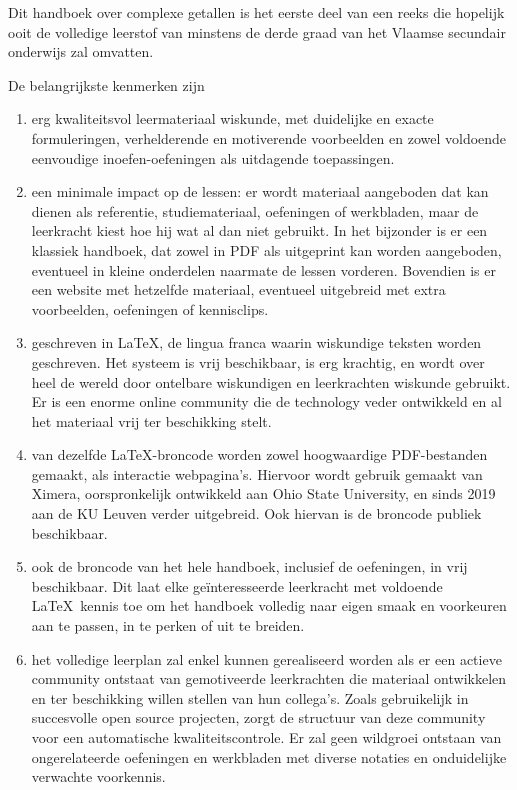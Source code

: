 \documentclass{ximera}
\begin{document}
	\author{Wim Obbels}
	\label{xim:xuitleg_leerkrachten}

    Dit handboek over complexe getallen is het eerste deel van een reeks die hopelijk ooit de volledige leerstof van minstens de derde graad van het Vlaamse secundair onderwijs zal omvatten.

    De belangrijkste kenmerken zijn
    \begin{enumerate}
        \item erg kwaliteitsvol leermateriaal wiskunde, met duidelijke en exacte formuleringen, verhelderende en motiverende voorbeelden en zowel voldoende eenvoudige inoefen-oefeningen als uitdagende toepassingen.
        \item een minimale impact op de lessen: er wordt materiaal aangeboden dat kan dienen als referentie, studiemateriaal, oefeningen of werkbladen, maar de leerkracht kiest hoe hij wat al dan niet gebruikt. In het bijzonder is er een klassiek handboek, dat zowel in PDF als uitgeprint kan worden aangeboden, eventueel in kleine onderdelen naarmate de lessen vorderen. Bovendien is er een website met hetzelfde materiaal, eventueel uitgebreid met extra voorbeelden, oefeningen of kennisclips.
        \item geschreven in \LaTeX, de lingua franca waarin wiskundige teksten worden geschreven. Het systeem is vrij beschikbaar, is erg krachtig, en wordt over heel de wereld door ontelbare wiskundigen en leerkrachten wiskunde gebruikt. Er is een enorme online community die de technology veder ontwikkeld en al het materiaal vrij ter beschikking stelt.
        \item van dezelfde \LaTeX-broncode worden zowel hoogwaardige PDF-bestanden gemaakt, als interactie webpagina's. Hiervoor wordt gebruik gemaakt van Ximera, oorspronkelijk ontwikkeld aan Ohio State University, en sinds 2019 aan de KU Leuven verder uitgebreid. Ook hiervan is de broncode publiek beschikbaar.
        \item ook de broncode van het hele handboek, inclusief de oefeningen, in vrij beschikbaar. Dit laat elke geïnteresseerde leerkracht met voldoende \LaTeX\ kennis toe om het handboek volledig naar eigen smaak en voorkeuren aan te passen, in te perken of uit te breiden.
        \item het volledige leerplan zal enkel kunnen gerealiseerd worden als er een actieve community ontstaat van gemotiveerde leerkrachten die materiaal ontwikkelen en ter beschikking willen stellen van hun collega's. Zoals gebruikelijk in succesvolle open source projecten, zorgt de structuur van deze community voor een automatische kwaliteitscontrole. Er zal geen wildgroei ontstaan van ongerelateerde oefeningen en werkbladen met diverse notaties en onduidelijke verwachte voorkennis. 

\end{enumerate}
\end{document}
